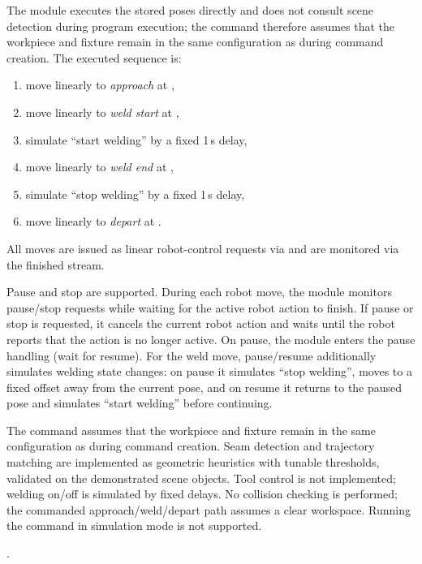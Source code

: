 The module executes the stored poses directly and does not consult scene detection during program execution; the command therefore assumes that the workpiece and fixture remain in the same configuration as during command creation.
The executed sequence is:
\begin{enumerate}[nosep,label=(\arabic*)]
    \item move linearly to \emph{approach} at ,
    \item move linearly to \emph{weld start} at ,
    \item simulate ``start welding'' by a fixed 1\,s delay,
    \item move linearly to \emph{weld end} at ,
    \item simulate ``stop welding'' by a fixed 1\,s delay,
    \item move linearly to \emph{depart} at .
\end{enumerate}
All moves are issued as linear robot-control requests via  and are monitored via the finished stream.

Pause and stop are supported. During each robot move, the module monitors pause/stop requests while waiting for the active robot action to finish. If pause or stop is requested, it cancels the current robot action and waits until the robot reports that the action is no longer active.
On pause, the module enters the  pause handling (wait for resume). For the weld move, pause/resume additionally simulates welding state changes: on pause it simulates ``stop welding'', moves to a fixed offset away from the current pose, and on resume it returns to the paused pose and simulates ``start welding'' before continuing.

The command assumes that the workpiece and fixture remain in the same configuration as during command creation.
Seam detection and trajectory matching are implemented as geometric heuristics with tunable thresholds, validated on the demonstrated scene objects.
Tool control is not implemented; welding on/off is simulated by fixed delays.
No collision checking is performed; the commanded approach/weld/depart path assumes a clear workspace.
Running the command in simulation mode is not supported.

.

